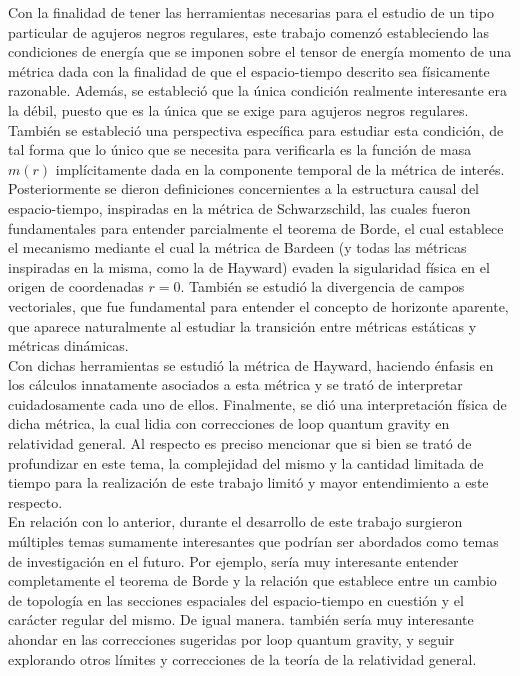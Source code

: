 \documentclass[16pt,a4paper]{article}
\numberwithin{equation}{section}
\theoremstyle{definition}
\begin{document}
Con la finalidad de tener las herramientas necesarias para el estudio de un tipo particular de agujeros negros regulares, este trabajo comenzó estableciendo las condiciones de energía que se imponen sobre el tensor de energía momento de una métrica dada con la finalidad de que el espacio-tiempo descrito sea físicamente razonable. Además, se estableció que la única condición realmente interesante era la débil, puesto que es la única que se exige para agujeros negros regulares. También se estableció una perspectiva específica para estudiar esta condición, de tal forma que lo único que se necesita para verificarla es la función de masa $m(r)$ implícitamente dada en la componente temporal de la métrica de interés.\\

Posteriormente se dieron definiciones concernientes a la estructura causal del espacio-tiempo, inspiradas en la métrica de Schwarzschild, las cuales fueron fundamentales para entender parcialmente el teorema de Borde, el cual establece el mecanismo mediante el cual la métrica de Bardeen (y todas las métricas inspiradas en la misma, como la de Hayward) evaden la sigularidad física en el origen de coordenadas $r=0$.  También se estudió la divergencia de campos vectoriales, que fue fundamental para entender el concepto de horizonte aparente, que aparece naturalmente al estudiar la transición entre métricas estáticas y métricas dinámicas.\\

Con dichas herramientas se estudió la métrica de Hayward, haciendo énfasis en los cálculos innatamente asociados a esta métrica y se trató de interpretar cuidadosamente cada uno de ellos. Finalmente, se dió una interpretación física de dicha métrica, la cual lidia con correcciones de loop quantum gravity en relatividad general. Al respecto es preciso mencionar que si bien se trató de profundizar en este tema, la complejidad del mismo y la cantidad limitada de tiempo para la realización de este trabajo limitó y mayor entendimiento a este respecto.\\

En relación con lo anterior, durante el desarrollo de este trabajo surgieron múltiples temas sumamente interesantes que podrían ser abordados como temas de investigación en el futuro. Por ejemplo, sería muy interesante entender completamente el teorema de Borde y la relación que establece entre un cambio de topología en las secciones espaciales del espacio-tiempo en cuestión y el carácter regular del mismo. De igual manera. también sería muy interesante ahondar en las correcciones sugeridas por loop quantum gravity, y seguir explorando otros límites y correcciones de la teoría de la relatividad general.


\newpage


\end{document}
